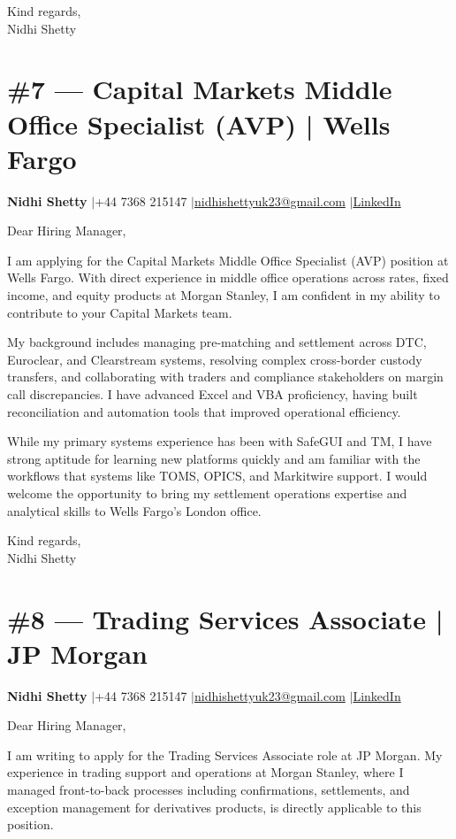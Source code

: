 \documentclass[11pt,a4paper]{article}
\makeatletter
\newcommand{\coverheader}{%
\begin{flushleft}
{\bfseries Nidhi Shetty} \enspace$\vert$\enspace +44 7368 215147 \enspace$\vert$\enspace \href{mailto:nidhishettyuk23@gmail.com}{nidhishettyuk23@gmail.com} \enspace$\vert$\enspace \href{https://www.linkedin.com/in/nidhi-shetty23-1841b7181}{LinkedIn}
\end{flushleft}
\vspace{4pt}
}
\makeatother
\begin{document}
\vspace{8pt}
Kind regards,\\
Nidhi Shetty

\newpage
\section{\#7 --- Capital Markets Middle Office Specialist (AVP) | Wells Fargo}
\coverheader

Dear Hiring Manager,

I am applying for the Capital Markets Middle Office Specialist (AVP) position at Wells Fargo. With direct experience in middle office operations across rates, fixed income, and equity products at Morgan Stanley, I am confident in my ability to contribute to your Capital Markets team.

My background includes managing pre-matching and settlement across DTC, Euroclear, and Clearstream systems, resolving complex cross-border custody transfers, and collaborating with traders and compliance stakeholders on margin call discrepancies. I have advanced Excel and VBA proficiency, having built reconciliation and automation tools that improved operational efficiency.

While my primary systems experience has been with SafeGUI and TM, I have strong aptitude for learning new platforms quickly and am familiar with the workflows that systems like TOMS, OPICS, and Markitwire support. I would welcome the opportunity to bring my settlement operations expertise and analytical skills to Wells Fargo's London office.

\vspace{8pt}
Kind regards,\\
Nidhi Shetty

\newpage
\section{\#8 --- Trading Services Associate | JP Morgan}
\coverheader

Dear Hiring Manager,

I am writing to apply for the Trading Services Associate role at JP Morgan. My experience in trading support and operations at Morgan Stanley, where I managed front-to-back processes including confirmations, settlements, and exception management for derivatives products, is directly applicable to this position.
\end{document}
